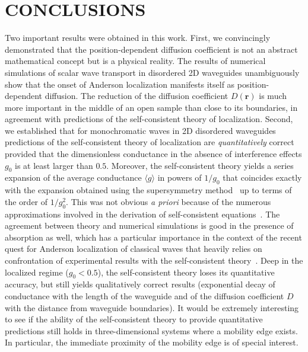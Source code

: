 \section{CONCLUSIONS}
\label{sec:conclusions_Dz}

Two important results were obtained in this work. First, we convincingly demonstrated that the position-dependent diffusion coefficient is not an abstract mathematical concept but is a physical reality. The results of numerical simulations of scalar wave transport in disordered 2D waveguides unambiguously show that the onset of Anderson localization manifests itself as position-dependent diffusion. The reduction of the diffusion coefficient $D(\mathbf{r})$ is much more important in the middle of an open sample than close to its boundaries, in agreement with predictions of the self-consistent theory of localization.
Second, we established that for monochromatic waves in 2D disordered waveguides predictions of the self-consistent theory of localization are {\it quantitatively\/} correct provided that the dimensionless conductance in the absence of interference effects $g_0$ is at least larger than $0.5$. Moreover, the self-consistent theory yields a series expansion of the average conductance $\langle g \rangle$ in powers of $1/g_0$ that coincides exactly with the expansion obtained using the supersymmetry method~\cite{2000_Mirlin} up to terms of the order of $1/g_0^2$. This was not obvious {\it a priori\/} because of the numerous approximations involved in the derivation of self-consistent equations~\cite{2008_Cherroret}. The agreement between theory and numerical simulations is good in the presence of absorption as well, which has a particular importance in the context of the recent quest for Anderson localization of classical waves that heavily relies on confrontation of experimental results with the self-consistent theory~\cite{2004_Skipetrov,2008_van_Tiggelen_Nature,2006_Maret_PRL,2006_Skipetrov_dynamics,2003_Genack}. Deep in the localized regime ($g_0 < 0.5$), the self-consistent theory loses its quantitative accuracy, but still yields qualitatively correct results (exponential decay of conductance with the length of the waveguide and of the diffusion coefficient $D$ with the distance from waveguide boundaries). It would be extremely interesting to see if the ability of the self-consistent theory to provide quantitative predictions still holds in three-dimensional systems where a mobility edge exists. In particular, the immediate proximity of the mobility edge is of special interest.


